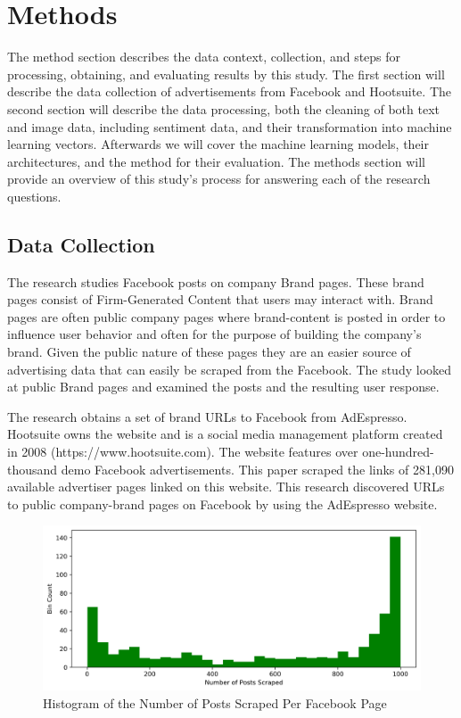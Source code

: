 \documentclass[mksc,blindrev]{informs3} %
\begin{document}
\section{Methods}
The method section describes the data context, collection, and steps for processing, obtaining, and evaluating results by this study. The first section will describe the data collection of advertisements from Facebook and Hootsuite. The second section will describe the data processing, both the cleaning of both text and image data, including sentiment data, and their transformation into machine learning vectors. Afterwards we will cover the machine learning models, their architectures, and the method for their evaluation. The methods section will provide an overview of this study's process for answering each of the research questions.

\subsection{Data Collection}
The research studies Facebook posts on company Brand pages. These brand pages consist of Firm-Generated Content that users may interact with. Brand pages are often public company pages where brand-content is posted in order to influence user behavior and often for the purpose of building the company's brand. Given the public nature of these pages they are an easier source of advertising data that can easily be scraped from the Facebook. The study looked at public Brand pages and examined the posts and the resulting user response.

The research obtains a set of brand URLs to Facebook from AdEspresso. Hootsuite owns the website and is a social media management platform created in 2008 (https://www.hootsuite.com). The website features over one-hundred-thousand demo Facebook advertisements. This paper scraped the links of 281,090 available advertiser pages linked on this website. This research discovered URLs to public company-brand pages on Facebook by using the AdEspresso website.

\begin{figure}
    \includegraphics[width=\columnwidth]{images/Posts_Per_Page_Histogram.png}
    \caption{Histogram of the Number of Posts Scraped Per Facebook Page}
    \label{fig:histogram_posts_scraped}
\end{figure}
\end{document}

